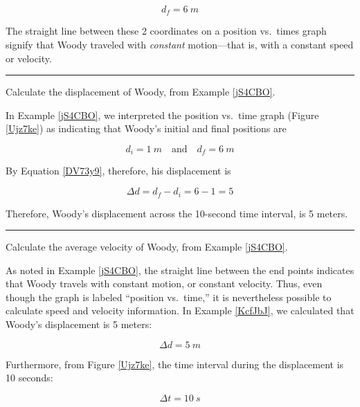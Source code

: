 \documentclass{article}
\begin{document}
\begin{equation*}
    d_f = \SI{6}{m}
\end{equation*}

The straight line between these 2 coordinates on a position vs.~times graph  signify that Woody traveled with \textit{constant} motion---that is, with a constant speed or velocity.

\hrule

\begin{example} \label{KcfJbJ}
    Calculate the displacement of Woody, from Example \ref{jS4CBO}. 
\end{example}

 In Example \ref{jS4CBO}, we interpreted the position vs.~time graph (Figure \ref{Ujz7ke}) as indicating that Woody's initial and final positions are

\begin{equation*}
    d_i = \SI{1}{m} \quad \text{and} \quad d_f = \SI{6}{m}
\end{equation*}

By Equation \eqref{DV73y9}, therefore, his displacement is

\begin{equation*}
    \Delta d = d_f - d_i = 6 - 1 = 5
\end{equation*}

Therefore, Woody's displacement across the 10-second time interval, is 5 meters.

\hrule

\begin{example}
    Calculate the average velocity of Woody, from Example \ref{jS4CBO}. 
\end{example}

 As noted in Example \ref{jS4CBO}, the straight line between the end points indicates that Woody travels with constant motion, or constant velocity. Thus, even though the graph is labeled ``position vs.~time,'' it is nevertheless possible to calculate speed and velocity information. In Example \ref{KcfJbJ}, we calculated that Woody's displacement is 5 meters:

\begin{equation*}
    \Delta d = \SI{5}{m}
\end{equation*}

Furthermore, from Figure \ref{Ujz7ke}, the time interval during the displacement is 10 seconds:

\begin{equation*}
    \Delta t = \SI{10}{s}
\end{equation*}
\end{document}
